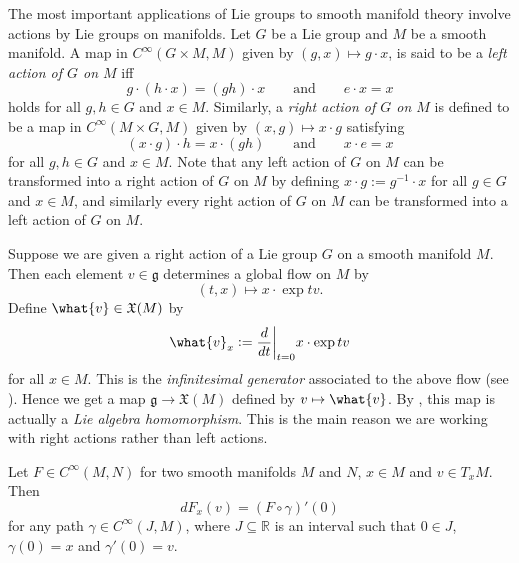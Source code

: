 The most important applications of Lie groups to smooth manifold theory involve actions by Lie groups on manifolds. Let $G$ be a Lie group and $M$ be a smooth manifold. A map in $C^\infty(G \times M,M)$ given by $(g,x) \mapsto g \cdot x$, is said to be a \emph{left action of $G$ on $M$} iff
\begin{equation*}
	g \cdot (h \cdot x) = (gh) \cdot x \qquad \text{and} \qquad e \cdot x = x
\end{equation*}
\noindent holds for all $g,h \in G$ and $x \in M$. Similarly, a \emph{right action of $G$ on $M$} is defined to be a map in $C^\infty(M \times G,M)$ given by $(x,g) \mapsto x \cdot g$ satisfying
\begin{equation*}
	(x \cdot g) \cdot h = x \cdot (gh) \qquad \text{and} \qquad x \cdot e = x
\end{equation*}
\noindent for all $g,h \in G$ and $x \in M$. Note that any left action of $G$ on $M$ can be transformed into a right action of $G$ on $M$ by defining $x \cdot g := g^{-1} \cdot x$ for all $g \in G$ and $x \in M$, and similarly every right action of $G$ on $M$ can  be transformed into a left action of $G$ on $M$. 

Suppose we are given a right action of a Lie group $G$ on a smooth manifold $M$. Then each element $v \in \mathfrak{g}$ determines a global flow on $M$ by
\begin{equation*}
	(t,x) \mapsto x \cdot \exp tv.
\end{equation*}
Define $\what{v} \in \mathfrak{X}(M)$ by
\begin{equation*}
	\what{v}_x := \frac{d}{dt}\bigg\vert_{t = 0} x \cdot \exp tv
\end{equation*}
\noindent for all $x \in M$. This is the \emph{infinitesimal generator} associated to the above flow (see \cite[210]{lee:smooth_manifolds:2013}). Hence we get a map $\mathfrak{g} \to \mathfrak{X}(M)$ defined by $v \mapsto \what{v}$. By \cite[526]{lee:smooth_manifolds:2013}, this map is actually a \emph{Lie algebra homomorphism}. This is the main reason we are working with right actions rather than left actions. 

\begin{lemma}
	\label{lem:computing_the_differential_using_a_velocity_vector}
	Let $F \in C^\infty(M,N)$ for two smooth manifolds $M$ and $N$, $x \in M$ and $v \in T_xM$. Then
	\begin{equation*}
		dF_x(v) = (F \circ \gamma)'(0)
	\end{equation*}
	\noindent for any path $\gamma \in C^\infty(J,M)$, where $J \subseteq \mathbb{R}$ is an interval such that $0 \in J$, $\gamma(0) = x$ and $\gamma'(0) = v$.
\end{lemma}

